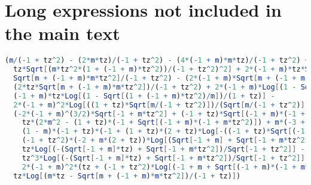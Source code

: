 \chapter{Long expressions not included in the main text\label{cha:long_expression}}
\begin{lstlisting}[breaklines=true, caption={Expression for Type-II interband transition with \( t_z > 1 \), given in Mathematica format.\label{lst:typeii-interband-tzpos}},language=Mathematica]
(m/(-1 + tz^2) - (2*m*tz)/(-1 + tz^2) - (4*(-1 + m)*m*tz)/(-1 + tz^2) + (m*tz^2)/(-1 + tz^2) +
  tz*Sqrt[(m*tz^2*(1 + (-1 + m)*tz^2))/(-1 + tz^2)^2] + 2*(-1 + m)*tz*Sqrt[(m*tz^2*(1 + (-1 + m)*tz^2))/(-1 + tz^2)^2] -
  Sqrt[m + (-1 + m)*m*tz^2]/(-1 + tz^2) - (2*(-1 + m)*Sqrt[m + (-1 + m)*m*tz^2])/(-1 + tz^2) +
  (2*tz*Sqrt[m + (-1 + m)*m*tz^2])/(-1 + tz^2) + 2*(-1 + m)*Log[(1 - Sqrt[(1 + (-1 + m)*tz^2)/m])/(1 + tz)] +
  (-1 + m)*tz*Log[(1 - Sqrt[(1 + (-1 + m)*tz^2)/m])/(1 + tz)] -
  2*(-1 + m)^2*Log[((1 + tz)*Sqrt[m/(-1 + tz^2)])/(Sqrt[m/(-1 + tz^2)] - Sqrt[(1 + (-1 + m)*tz^2)/(-1 + tz^2)])] -
  (-2*(-1 + m)^(3/2)*Sqrt[-1 + m*tz^2] + (-1 + tz)*Sqrt[(-1 + m)*(-1 + m*tz^2)] -
    tz*(2*m^2 - (1 + tz)*(-1 + Sqrt[(-1 + m)*(-1 + m*tz^2)]) + m*(-3 + tz*(-1 + 2*Sqrt[(-1 + m)*(-1 + m*tz^2)]))) -
    (1 - m)*(-1 + tz)*(-1 + (1 + tz)*(2 + tz)*Log[-((-1 + tz)*Sqrt[(-1 + m)/(-1 + tz^2)])]) -
    (-1 + tz^2)*(-2 + m*(2 + tz))*Log[(Sqrt[-1 + m] + Sqrt[-1 + m*tz^2])/Sqrt[-1 + tz^2]] +
    tz*Log[(-(Sqrt[-1 + m]*tz) + Sqrt[-1 + m*tz^2])/Sqrt[-1 + tz^2]] -
    tz^3*Log[(-(Sqrt[-1 + m]*tz) + Sqrt[-1 + m*tz^2])/Sqrt[-1 + tz^2]] -
    2*(-1 + m)^2*(tz + (-1 + tz^2)*Log[(-1 + m + Sqrt[(-1 + m)*(-1 + m*tz^2)])/(-1 + m + tz - m*tz)]))/(-1 + tz^2) -
  tz*Log[(m*tz - Sqrt[m + (-1 + m)*m*tz^2])/(-1 + tz)])
\end{lstlisting}


